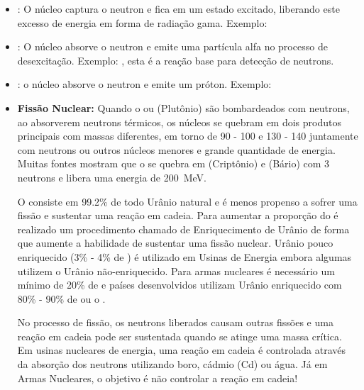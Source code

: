 \documentclass[11pt,a4paper]{article}
\begin{document}
                \begin{itemize}
                    \item {}: O núcleo captura o neutron e fica em um estado excitado, liberando este excesso de energia em forma de radiação gama. Exemplo: 
                    
                    \item {}: O núcleo absorve o neutron e emite uma partícula alfa no processo de desexcitação. Exemplo: , esta é a reação base para detecção de neutrons.
                    
                    \item {}: o núcleo absorve o neutron e emite um próton. Exemplo: 
                    
                    \item \textbf{Fissão Nuclear:} Quando o  ou  (Plutônio) são bombardeados com neutrons, ao absorverem neutrons térmicos, os núcleos se quebram em dois produtos principais com massas diferentes, em torno de 90 - 100 e 130 - 140 juntamente com neutrons ou outros núcleos menores e grande quantidade de energia. Muitas fontes mostram que o  se quebra em  (Criptônio) e  (Bário) com 3 neutrons e libera uma energia de \qty{200}{MeV}.
                    
                        O  consiste em 99.2\% de todo Urânio natural e é menos propenso a sofrer uma fissão e  sustentar uma reação em cadeia. Para aumentar a proporção do  é realizado um procedimento chamado de Enriquecimento de Urânio de forma que aumente a habilidade de sustentar uma fissão nuclear. Urânio pouco enriquecido (3\% - 4\% de ) é utilizado em Usinas de Energia embora algumas utilizem o Urânio não-enriquecido. Para armas nucleares é necessário um mínimo de 20\% de  e países desenvolvidos utilizam Urânio enriquecido com 80\% - 90\% de  ou o .

                        No processo de fissão, os neutrons liberados causam outras fissões e uma reação em cadeia pode ser sustentada quando se atinge uma massa crítica. Em usinas nucleares de energia, uma reação em cadeia é controlada através da absorção dos neutrons utilizando boro, cádmio (Cd) ou água. Já em Armas Nucleares, o objetivo é não controlar a reação em cadeia! 
                \end{itemize}
\end{document}

